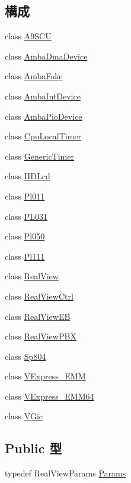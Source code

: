 \subsection*{構成}
\begin{DoxyCompactItemize}
\item 
class \hyperlink{classRealView_1_1A9SCU}{A9SCU}
\item 
class \hyperlink{classRealView_1_1AmbaDmaDevice}{AmbaDmaDevice}
\item 
class \hyperlink{classRealView_1_1AmbaFake}{AmbaFake}
\item 
class \hyperlink{classRealView_1_1AmbaIntDevice}{AmbaIntDevice}
\item 
class \hyperlink{classRealView_1_1AmbaPioDevice}{AmbaPioDevice}
\item 
class \hyperlink{classRealView_1_1CpuLocalTimer}{CpuLocalTimer}
\item 
class \hyperlink{classRealView_1_1GenericTimer}{GenericTimer}
\item 
class \hyperlink{classRealView_1_1HDLcd}{HDLcd}
\item 
class \hyperlink{classRealView_1_1Pl011}{Pl011}
\item 
class \hyperlink{classRealView_1_1PL031}{PL031}
\item 
class \hyperlink{classRealView_1_1Pl050}{Pl050}
\item 
class \hyperlink{classRealView_1_1Pl111}{Pl111}
\item 
class \hyperlink{classRealView_1_1RealView}{RealView}
\item 
class \hyperlink{classRealView_1_1RealViewCtrl}{RealViewCtrl}
\item 
class \hyperlink{classRealView_1_1RealViewEB}{RealViewEB}
\item 
class \hyperlink{classRealView_1_1RealViewPBX}{RealViewPBX}
\item 
class \hyperlink{classRealView_1_1Sp804}{Sp804}
\item 
class \hyperlink{classRealView_1_1VExpress__EMM}{VExpress\_\-EMM}
\item 
class \hyperlink{classRealView_1_1VExpress__EMM64}{VExpress\_\-EMM64}
\item 
class \hyperlink{classRealView_1_1VGic}{VGic}
\end{DoxyCompactItemize}
\subsection*{Public 型}
\begin{DoxyCompactItemize}
\item 
typedef RealViewParams \hyperlink{classRealView_aa902b300d4e5553ea4f127d69fc0fa3a}{Params}
\end{DoxyCompactItemize}
